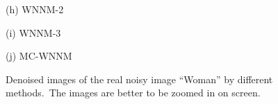 \documentclass[10pt,onecolumn,letterpaper]{article}
\begin{document}
\begin{figure}
{\begin{minipage}[t]{0.2\textwidth}
{\footnotesize (h) WNNM-2 \cite{wnnm}   }
\end{minipage}
\begin{minipage}[t]{0.2\textwidth}
\centering
{}
{\footnotesize (i) WNNM-3 \cite{wnnm}   }
\end{minipage}
\begin{minipage}[t]{0.2\textwidth}
\centering
{}
{\footnotesize (j) MC-WNNM  }
\end{minipage}
}
\vspace{-2mm}
\caption{Denoised images of the real noisy image ``Woman'' \cite{ncwebsite} by different methods.\ The images are better to be zoomed in on screen.}
\label{f3}
\vspace{-2mm}
\end{figure}
\end{document}

